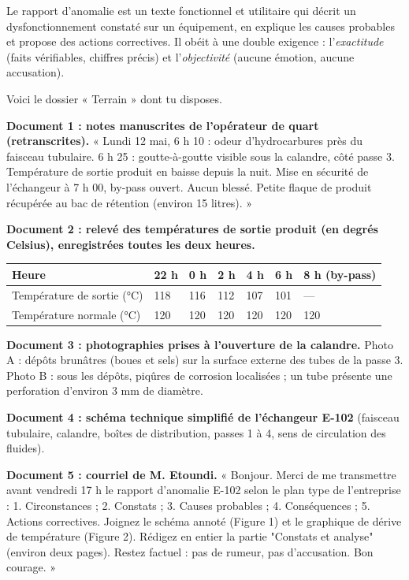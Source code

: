 \documentclass[11pt]{article}
\newcommand{\cle}[1]{{\popxbold\color{popdark}#1}}
\begin{document}
\begin{definition}
Le \cle{rapport d'anomalie} est un texte fonctionnel et utilitaire qui décrit un dysfonctionnement constaté sur un équipement, en explique les causes probables et propose des actions correctives. Il obéit à une double exigence : l'\emph{exactitude} (faits vérifiables, chiffres précis) et l'\emph{objectivité} (aucune émotion, aucune accusation).
\end{definition}

Voici le dossier « Terrain » dont tu disposes.

\textbf{Document 1 : notes manuscrites de l'opérateur de quart (retranscrites).}
« Lundi 12 mai, 6 h 10 : odeur d'hydrocarbures près du faisceau tubulaire. 6 h 25 : goutte-à-goutte visible sous la calandre, côté passe 3. Température de sortie produit en baisse depuis la nuit. Mise en sécurité de l'échangeur à 7 h 00, by-pass ouvert. Aucun blessé. Petite flaque de produit récupérée au bac de rétention (environ 15 litres). »

\textbf{Document 2 : relevé des températures de sortie produit (en degrés Celsius), enregistrées toutes les deux heures.}

\begin{center}
\begin{tabularx}{\linewidth}{|l|X|X|X|X|X|X|}\hline
\rowcolor{popblueL}
Heure & 22 h & 0 h & 2 h & 4 h & 6 h & 8 h (by-pass) \\ \hline
Température de sortie (°C) & 118 & 116 & 112 & 107 & 101 & --- \\ \hline
Température normale (°C) & 120 & 120 & 120 & 120 & 120 & 120 \\ \hline
\end{tabularx}
\end{center}

\textbf{Document 3 : photographies prises à l'ouverture de la calandre.}
Photo A : dépôts brunâtres (boues et sels) sur la surface externe des tubes de la passe 3. Photo B : sous les dépôts, piqûres de corrosion localisées ; un tube présente une perforation d'environ 3 mm de diamètre.

\textbf{Document 4 : schéma technique simplifié de l'échangeur E-102} (faisceau tubulaire, calandre, boîtes de distribution, passes 1 à 4, sens de circulation des fluides).

\textbf{Document 5 : courriel de M. Etoundi.}
« Bonjour. Merci de me transmettre avant vendredi 17 h le rapport d'anomalie E-102 selon le plan type de l'entreprise : 1. Circonstances ; 2. Constats ; 3. Causes probables ; 4. Conséquences ; 5. Actions correctives. Joignez le schéma annoté (Figure 1) et le graphique de dérive de température (Figure 2). Rédigez en entier la partie "Constats et analyse" (environ deux pages). Restez factuel : pas de rumeur, pas d'accusation. Bon courage. »
\end{document}
